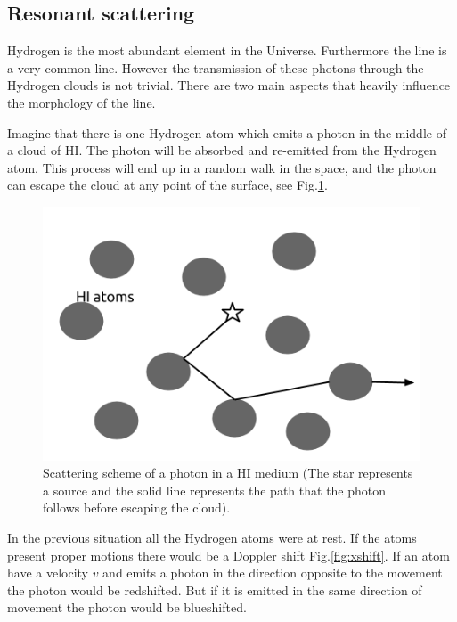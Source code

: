 \subsection{Resonant scattering}\label{sec:resonant}

Hydrogen is the most abundant element in the Universe. Furthermore
the \ly line is a very common line. However the transmission of these
\ly  photons through the Hydrogen clouds is not trivial. There 
are two main aspects that heavily influence the morphology of the line.

Imagine that there is one Hydrogen atom which emits 
a \ly photon in the middle of a cloud of HI. 
The \ly photon will be absorbed and re-emitted from 
the Hydrogen atom. This process will end up in a random walk in the space,
and the photon can escape the cloud at any point of the surface, see 
Fig.\ref{fig:rw}.\\

\begin{figure}
\begin{center}
\includegraphics[scale=0.4]{Figures/randomwalk.png}
\end{center}\caption{Scattering scheme of a \ly photon in a HI medium
(The star represents a \ly source and the solid line represents the path that
the \ly photon follows before escaping the cloud).\label{fig:rw}}
\end{figure}


In the previous situation all the Hydrogen atoms were at rest. If the atoms
present proper motions there would be a Doppler shift Fig.\ref{fig:xshift}. 
If an atom have a velocity $v$ and emits a \ly photon in the direction 
opposite to the movement the \ly photon 
would be redshifted. But if it is emitted in the same direction of movement the
\ly photon would be blueshifted.    

